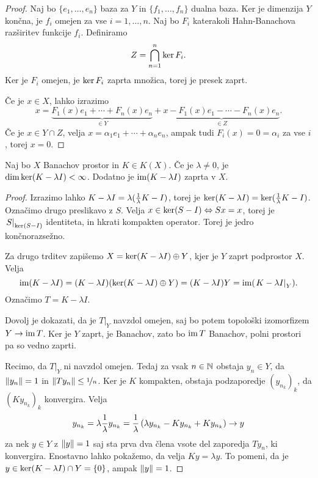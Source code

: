 \begin{proof}
  Naj bo $\{e_1, \ldots, e_n\}$ baza za $Y$ in $\{f_1, \ldots, f_n\}$ dualna
  baza.
  Ker je dimenzija $Y$ končna, je $f_i$ omejen za vse $i=1, \ldots, n$.
  Naj bo $F_i$ katerakoli Hahn-Banachova razširitev funkcije $f_i$.
  Definiramo
  \[
	Z = \bigcap_{n=1}^n \operatorname{ker} F_i.
  \]
  Ker je $F_i$ omejen, je $\operatorname{ker} F_i$ zaprta množica, torej je presek zaprt.

  Če je $x \in X$, lahko izrazimo
  \[
	x = \underbrace{ F_1(x) e_1 + \cdots + F_n(x) e_n }_{\in Y}
	+ \underbrace{ x - F_1(x) e_1 - \cdots - F_n(x) e_n }_{\in Z}.
  \]
  Če je $x \in Y \cap Z$, velja $x = \alpha_1 e_1 + \cdots + \alpha_n e_n$,
  ampak tudi $F_i(x) = 0 = \alpha_i$ za vse $i$, torej $x = 0$.
\end{proof}


\begin{trditev}
  Naj bo $X$ Banachov prostor in $K \in K(X)$.
  Če je $\lambda \ne 0$, je $\dim \operatorname{ker} (K - \lambda I) < \infty$.
  Dodatno je $\operatorname{im}(K - \lambda I)$ zaprta v $X$.
\end{trditev}

\begin{proof}
  Izrazimo lahko $K - \lambda I = \lambda (\frac{1}{\lambda} K - I)$, torej je
  $\operatorname{ker} (K - \lambda I) = \operatorname{ker} (\frac{1}{\lambda} K - I)$.
  Označimo drugo preslikavo z $S$.
  Velja $x \in \operatorname{ker} (S - I) \Leftrightarrow Sx = x$, torej je $\left. S \right|_{\operatorname{ker}
	(S-I)}$ identiteta, in hkrati kompakten operator.
  Torej je jedro končnorazsežno.

  Za drugo trditev zapišemo $X = \operatorname{ker}(K - \lambda I) \oplus Y$, kjer je $Y$
  zaprt podprostor $X$.
  Velja
  \[
	\operatorname{im} (K - \lambda I)
	= (K - \lambda I) (\operatorname{ker} (K - \lambda I) \oplus Y)
	= (K - \lambda I) Y
	= \operatorname{im} (\left. K - \lambda I \right|_Y).
  \]
  Označimo $T = K - \lambda I$.

  Dovolj je dokazati, da je $\left. T \right|_Y$ navzdol omejen, saj bo potem
  topološki izomorfizem $Y \to \operatorname{im} T$.
  Ker je $Y$ zaprt, je Banachov, zato bo $\operatorname{im} T$ Banachov, polni prostori pa so
  vedno zaprti.

  Recimo, da $\left. T \right|_Y$ ni navzdol omejen.
  Tedaj za vsak $n \in \mathbb{N}$ obstaja $y_n \in Y$, da $\left\lVert y_n\right\rVert = 1$ in $\left\lVert T
	y_n\right\rVert \le \nicefrac{1}{n}$.
  Ker je $K$ kompakten, obstaja podzaporedje $(y_{n_k})_k$, da $(K
  y_{n_k})_k$ konvergira.
  Velja
  \[
	y_{n_k} = \lambda \frac{1}{\lambda} y_{n_k} = \frac{1}{\lambda} \left( \lambda
	  y_{n_k} - K y_{n_k} + K y_{n_k} \right) \to y
  \]
  za nek $y \in Y$ z $\left\lVert y\right\rVert = 1$ saj sta prva dva člena vsote del zaporedja
  $T y_n$, ki konvergira.
  Enostavno lahko pokažemo, da velja $Ky = \lambda y$.
  To pomeni, da je $y \in \operatorname{ker} (K - \lambda I) \cap Y = \{0\}$, ampak
  $\left\lVert y\right\rVert = 1$.
  \protislovje{}
\end{proof}

